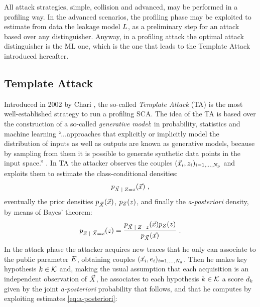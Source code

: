 All attack strategies, simple, collision and advanced, may be performed in a profiling way. In the advanced scenarios, the profiling phase may be exploited to estimate from data the leakage model $L$, as a preliminary step for an attack based over any distinguisher. Anyway, in a profiling attack the optimal attack distinguisher is the ML one, which is the one that leads to the Template Attack introduced hereafter.



\subsection{Template Attack}\label{sec:TA}
Introduced in 2002 by Chari \cite{Chari2003}, the so-called \emph{Template Attack} (TA) is the most well-established strategy to run a profiling SCA. The idea of the TA is based over the construction of a so-called \emph{generative model}: in probability, statistics and machine learning \enquote{...approaches that explicitly or implicitly model the distribution of inputs as well as outputs are known as generative models, because by sampling from them it is possible to generate synthetic data points in the input space.} \cite{christopher2006pattern}.
In TA the attacker observes the couples $(\vec{x}_i, z_i)_{i=1, \dots , N_p}$  and exploits them to estimate the class-conditional densities:
\begin{equation}\label{eq:class-conditional}
\pdf_{\given{\vaLeakVec}{\sensRandVar = \sensVar}}(\vLeakVec)\mbox{ ,}
\end{equation}
eventually the prior densities $p_{\vec{X}}(\vec{x})$, $p_{Z}(z)$, and finally the \textit{a-posteriori} density, by means of Bayes' theorem:
\begin{equation}\label{eq:a-posteriori}
\pdf_{\given{\sensRandVar}{  \vaLeakVec = \vLeakVec}}(\sensVar) = \frac{\pdf_{\given{\vaLeakVec}{\sensRandVar = \sensVar}}(\vLeakVec)\pdf_{\sensRandVar}(\sensVar)} {\pdf_{\vaLeakVec}(\vLeakVec)}\mbox{ .}
\end{equation}
In the attack phase the attacker acquires new traces that he only can associate to the public parameter $E$, obtaining couples  $(\vec{x}_i, e_i)_{i=1, \dots , N_a}$. Then he makes key hypothesis $k \in \mathcal{K}$ and, making the usual assumption that each acquisition is an independent observation of $\vec{X}$, he associates to each hypothesis $k \in \mathcal{K}$ a score $d_k$ given by the joint \textit{a-posteriori} probability that follows, and that he computes by exploiting estimates \eqref{eq:a-posteriori}:

